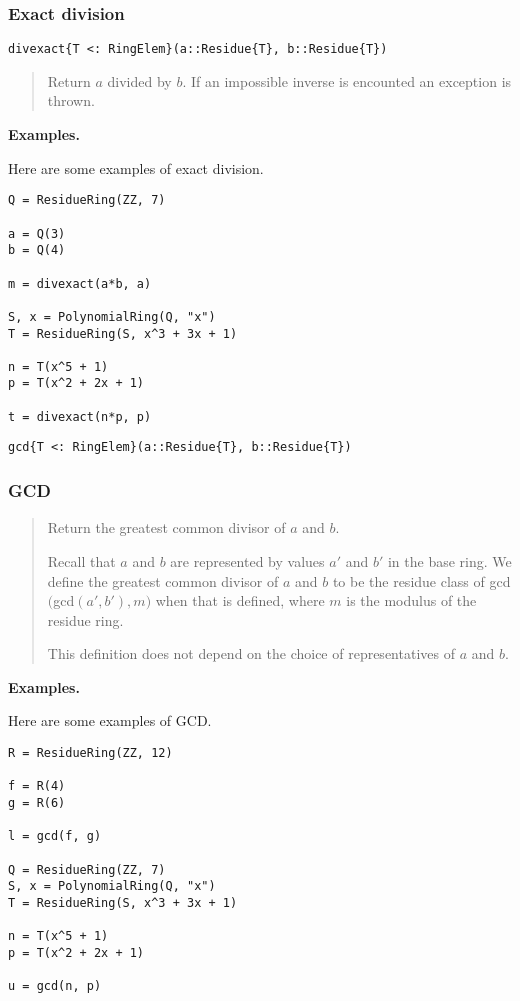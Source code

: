 \documentclass[a4paper,10pt]{article}
\newcommand{\desc}[1]{\vspace{-3mm}\begin{quote}#1\end{quote}}
\begin{document}
\subsubsection{Exact division}

\begin{lstlisting}
divexact{T <: RingElem}(a::Residue{T}, b::Residue{T})
\end{lstlisting}

\desc{Return $a$ divided by $b$. If an impossible inverse is encounted
an exception is thrown.}

\textbf{Examples.}

Here are some examples of exact division.

\begin{lstlisting}
Q = ResidueRing(ZZ, 7)

a = Q(3)
b = Q(4)

m = divexact(a*b, a)

S, x = PolynomialRing(Q, "x")
T = ResidueRing(S, x^3 + 3x + 1)

n = T(x^5 + 1)
p = T(x^2 + 2x + 1)

t = divexact(n*p, p)
\end{lstlisting}

\begin{lstlisting}
gcd{T <: RingElem}(a::Residue{T}, b::Residue{T})
\end{lstlisting}

\subsubsection{GCD}

\desc{Return the greatest common divisor of $a$ and $b$. 

Recall that $a$ and $b$ are represented by values $a'$ and $b'$ in the base
ring. We define the greatest common divisor of $a$ and $b$ to be the residue
class of gcd$($gcd$(a', b'), m)$ when that is defined, where $m$ is the
modulus of the residue ring.

This definition does not depend on the choice of representatives of
$a$ and $b$.}

\textbf{Examples.}

Here are some examples of GCD.

\begin{lstlisting}
R = ResidueRing(ZZ, 12)

f = R(4)
g = R(6)

l = gcd(f, g)

Q = ResidueRing(ZZ, 7)
S, x = PolynomialRing(Q, "x")
T = ResidueRing(S, x^3 + 3x + 1)

n = T(x^5 + 1)
p = T(x^2 + 2x + 1)

u = gcd(n, p)
\end{lstlisting}
\end{document}
